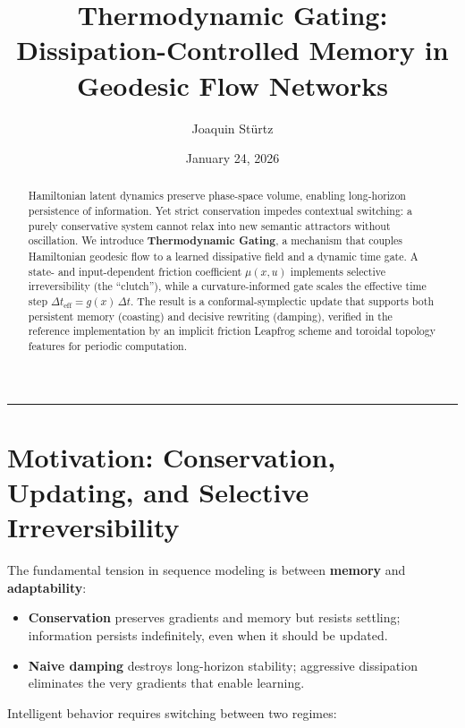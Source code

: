 \documentclass[12pt,letterpaper,twoside]{article}
\title{\textbf{Thermodynamic Gating: Dissipation-Controlled Memory in Geodesic Flow Networks}}
\author{Joaquin Stürtz}
\date{January 24, 2026}
\begin{document}
\maketitle
\thispagestyle{empty}

\vspace{0.5cm}

\begin{abstract}
Hamiltonian latent dynamics preserve phase-space volume, enabling long-horizon persistence of information. Yet strict conservation impedes contextual switching: a purely conservative system cannot relax into new semantic attractors without oscillation. We introduce \textbf{Thermodynamic Gating}, a mechanism that couples Hamiltonian geodesic flow to a learned dissipative field and a dynamic time gate. A state- and input-dependent friction coefficient $\mu(x,u)$ implements selective irreversibility (the ``clutch''), while a curvature-informed gate scales the effective time step $\Delta t_{\text{eff}} = g(x)\,\Delta t$. The result is a conformal-symplectic update that supports both persistent memory (coasting) and decisive rewriting (damping), verified in the reference implementation by an implicit friction Leapfrog scheme and toroidal topology features for periodic computation.
\end{abstract}

\vspace{0.5cm}
\hrule
\vspace{0.5cm}

\tableofcontents
\newpage

\section{Motivation: Conservation, Updating, and Selective Irreversibility}

The fundamental tension in sequence modeling is between \textbf{memory} and \textbf{adaptability}:

\begin{itemize}
\item \textbf{Conservation} preserves gradients and memory but resists settling; information persists indefinitely, even when it should be updated.
\item \textbf{Naive damping} destroys long-horizon stability; aggressive dissipation eliminates the very gradients that enable learning.
\end{itemize}

Intelligent behavior requires switching between two regimes:
\end{document}
